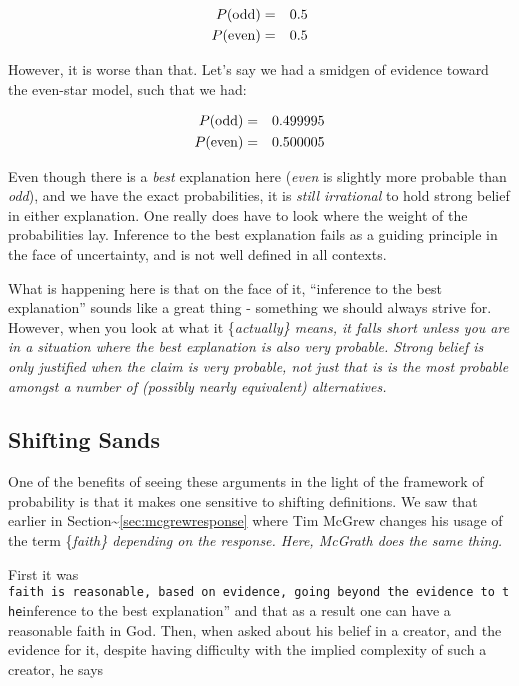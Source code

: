 \documentclass{tufte-book}
\begin{document}
\begin{eqnarray*}
P({\rm odd}) &=&0.5 \\
P({\rm even})&=&0.5
\end{eqnarray*}

However, it is worse than that. Let's say we had a smidgen of evidence
toward the even-star model, such that we had:

\begin{eqnarray*}
P({\rm odd}) &=&0.499995 \\
P({\rm even})&=&0.500005
\end{eqnarray*}

Even though there is a \emph{best} explanation here (\emph{even} is
slightly more probable than \emph{odd}), and we have the exact
probabilities, it is \emph{still irrational} to hold strong belief in
either explanation. One really does have to look where the weight of the
probabilities lay. Inference to the best explanation fails as a guiding
principle in the face of uncertainty, and is not well defined in all
contexts.

What is happening here is that on the face of it, ``inference to the
best explanation'' sounds like a great thing - something we should
always strive for. However, when you look at what it \{\em actually\}
means, it falls short unless you are in a situation where the best
explanation is also very probable. Strong belief is only justified when
the claim is very probable, not just that is is the most probable
amongst a number of (possibly nearly equivalent) alternatives.

\subsection{Shifting Sands}\label{playing-dodgeball-with-an-apologist}

One of the benefits of seeing these arguments in the light of the
framework of probability is that it makes one sensitive to shifting
definitions. We saw that earlier in
Section\textasciitilde{}\ref{sec:mcgrewresponse} where Tim McGrew
changes his usage of the term \{\em faith\} depending on the response.
Here, McGrath does the same thing.

First it was
\texttt{faith\ is\ reasonable\textquotesingle{}\textquotesingle{},\ based\ on\ evidence,\ going\ beyond\ the\ evidence\ to\ the}inference
to the best explanation'' and that as a result one can have a reasonable
faith in God. Then, when asked about his belief in a creator, and the
evidence for it, despite having difficulty with the implied complexity
of such a creator, he says
\end{document}

